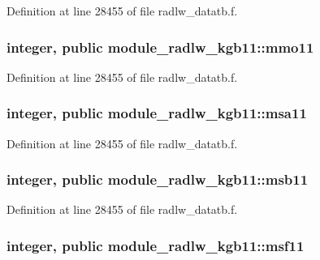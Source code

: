 Definition at line 28455 of file radlw\+\_\+datatb.\+f.

\subsubsection[{\texorpdfstring{mmo11}{mmo11}}]{\setlength{\rightskip}{0pt plus 5cm}integer, public module\+\_\+radlw\+\_\+kgb11\+::mmo11}\hypertarget{namespacemodule__radlw__kgb11_a6aabd24aa785ef8689c63b01aaaab243}{}\label{namespacemodule__radlw__kgb11_a6aabd24aa785ef8689c63b01aaaab243}


Definition at line 28455 of file radlw\+\_\+datatb.\+f.

\subsubsection[{\texorpdfstring{msa11}{msa11}}]{\setlength{\rightskip}{0pt plus 5cm}integer, public module\+\_\+radlw\+\_\+kgb11\+::msa11}\hypertarget{namespacemodule__radlw__kgb11_afd15a7b87b3d49c53c12e023c604b360}{}\label{namespacemodule__radlw__kgb11_afd15a7b87b3d49c53c12e023c604b360}


Definition at line 28455 of file radlw\+\_\+datatb.\+f.

\subsubsection[{\texorpdfstring{msb11}{msb11}}]{\setlength{\rightskip}{0pt plus 5cm}integer, public module\+\_\+radlw\+\_\+kgb11\+::msb11}\hypertarget{namespacemodule__radlw__kgb11_aa8630868015cb7e358107e6418e35276}{}\label{namespacemodule__radlw__kgb11_aa8630868015cb7e358107e6418e35276}


Definition at line 28455 of file radlw\+\_\+datatb.\+f.

\subsubsection[{\texorpdfstring{msf11}{msf11}}]{\setlength{\rightskip}{0pt plus 5cm}integer, public module\+\_\+radlw\+\_\+kgb11\+::msf11}\hypertarget{namespacemodule__radlw__kgb11_a7dcec9b9f19a3f5f13d443572d834628}{}\label{namespacemodule__radlw__kgb11_a7dcec9b9f19a3f5f13d443572d834628}


